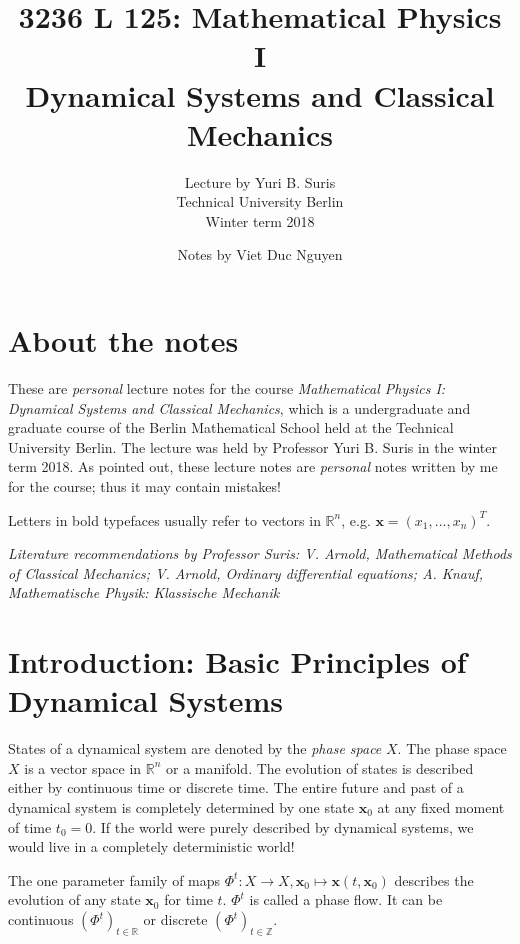 \documentclass[hidelinks,a4paper, 11pt]{article}
\theoremstyle{plain}
\theoremstyle{break}
\theoremstyle{plain}
\theoremstyle{definition}
\begin{document}
\title{3236 L 125: Mathematical Physics I\\ \large{Dynamical Systems and Classical Mechanics} }
\author{Lecture by Yuri B. Suris \\ Technical University Berlin \\ Winter term 2018}
\date{ Notes by Viet Duc Nguyen}

\maketitle
\tableofcontents

\setcounter{section}{-1}
\section{About the notes}
These are \emph{personal} lecture notes for the course \emph{Mathematical Physics I: Dynamical Systems and Classical Mechanics}, which is a undergraduate and graduate course of the Berlin Mathematical School held at the Technical University Berlin. The lecture was held by Professor Yuri B. Suris in the winter term 2018. As pointed out, these lecture notes are \emph{personal} notes written by me for the course; thus it may contain mistakes!

Letters in bold typefaces usually refer to vectors in $\mathbb R^n$, e.g. $\mathbf x = (x_1,...,x_n)^T$.

\textit{Literature recommendations by Professor Suris: V. Arnold, Mathematical Methods of Classical Mechanics; V. Arnold, Ordinary differential equations; A. Knauf, Mathematische Physik: Klassische Mechanik}

\section{Introduction: Basic Principles of Dynamical Systems}

States of a dynamical system are denoted by the \emph{phase space} $X$. The phase space $X$ is a vector space in $\mathbb R^n$ or a manifold. The evolution of states is described either by continuous time or discrete time. The entire future and past of a dynamical system is completely determined by one state $\mathbf x_0$ at any fixed moment of time $t_0 = 0$. If the world were purely described by dynamical systems, we would live in a completely deterministic world!

The one parameter family of maps $\Phi^t: X \to X, \mathbf x_0 \mapsto \mathbf x(t,\mathbf x_0)$ describes the evolution of any state $\mathbf x_0$ for time $t$. $\Phi^t$ is called a phase flow. It can be continuous $(\Phi^t)_{t \in \mathbb R}$ or discrete $(\Phi^t)_{t \in \mathbb Z}$.
\end{document}
